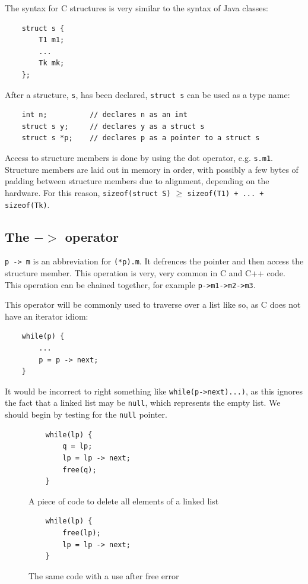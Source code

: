 \documentclass{article}
\begin{document}
	\par 
	The syntax for C structures is very similar to the syntax of Java classes:
	
	\begin{verbatim}
	struct s {
	    T1 m1;
	    ...
	    Tk mk;
	};
	\end{verbatim}
	
	After a structure, \texttt{s}, has been declared, \texttt{struct s} can be used as a type name:
	
	\begin{verbatim}
	int n;          // declares n as an int
	struct s y;     // declares y as a struct s
	struct s *p;    // declares p as a pointer to a struct s
	\end{verbatim}	
	
	Access to structure members is done by using the dot operator, e.g. \texttt{s.m1}. Structure members are laid out in memory in order, with possibly a few bytes of padding between structure members due to alignment, depending on the hardware. For this reason, \texttt{sizeof(struct S)} $\geq$ \texttt{sizeof(T1) + ... + sizeof(Tk)}.
	
	\subsection{The $->$ operator}
	\texttt{p -> m} is an abbreviation for \texttt{(*p).m}. It defrences the pointer and then access the structure member. This operation is very, very common in C and C++ code. This operation can be chained together, for example \texttt{p->m1->m2->m3}.
	
	\par 
	This operator will be commonly used to traverse over a list like so, as C does not have an iterator idiom:
	\begin{verbatim}
	while(p) {
	    ...
	    p = p -> next;
	}
	\end{verbatim}
	
	It would be incorrect to right something like \texttt{while(p->next){...})}, as this ignores the fact that a linked list may be \texttt{null}, which represents the empty list. We should begin by testing for the \texttt{null} pointer.
	\begin{figure}
	\begin{minipage}[b]{0.48\textwidth}
	\begin{verbatim}
	while(lp) {
	    q = lp;
	    lp = lp -> next;
	    free(q);
	}
	\end{verbatim}
	\caption{A piece of code to delete all elements of a linked list}
	\end{minipage}
	\hfill
	\begin{minipage}[b]{0.48\textwidth}
	\begin{verbatim}
	while(lp) {
	    free(lp);
	    lp = lp -> next;
	}
	\end{verbatim}
	\caption{The same code with a use after free error}
	\end{minipage}
	\end{figure}
	
\end{document}
